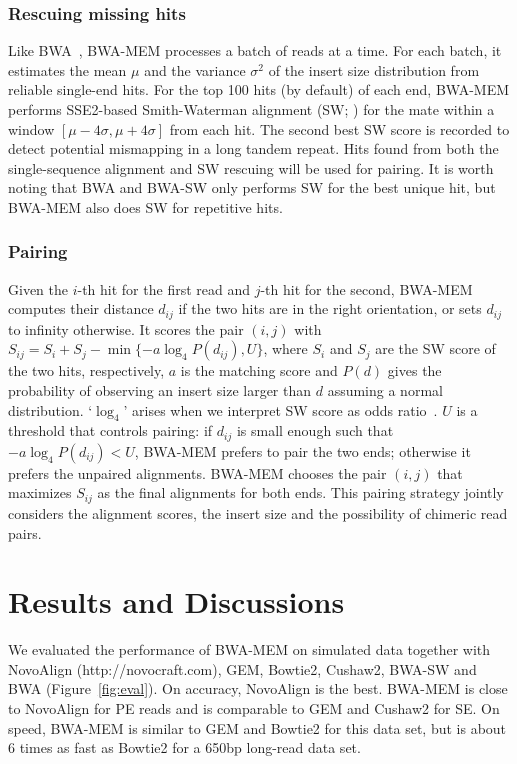 \documentclass{bioinfo}
\begin{document}
\begin{methods}
\subsubsection{Rescuing missing hits}
Like BWA~\citep{Li:2009uq}, BWA-MEM processes a batch of reads at a time.
For each batch, it estimates the mean $\mu$ and the variance $\sigma^2$
of the insert size distribution from reliable single-end hits. For the
top 100 hits (by default) of each end, BWA-MEM performs SSE2-based
Smith-Waterman alignment (SW; \citealt{Farrar:2007hs}) for the mate within a
window $[\mu-4\sigma,\mu+4\sigma]$ from each hit. The second best SW score is
recorded to detect potential mismapping in a long tandem repeat. Hits found
from both the single-sequence alignment and SW rescuing will be used for
pairing. It is worth noting that BWA and BWA-SW only performs SW for the
best unique hit, but BWA-MEM also does SW for repetitive hits.

\subsubsection{Pairing} Given the $i$-th hit for the first read and $j$-th hit
for the second, BWA-MEM computes their distance $d_{ij}$ if the two hits are in
the right orientation, or sets $d_{ij}$ to infinity otherwise. It scores the
pair $(i,j)$ with $S_{ij}=S_i+S_j-\min\{-a\log_4 P(d_{ij}),U\}$, where $S_i$
and $S_j$ are the SW score of the two hits, respectively, $a$ is the matching
score and $P(d)$ gives the probability of observing an insert size larger than
$d$ assuming a normal distribution. `$\log_4$' arises when we interpret SW
score as odds ratio~\citep{Durbin:1998uq}. $U$ is a threshold that controls
pairing: if $d_{ij}$ is small enough such that $-a\log_4 P(d_{ij})<U$, BWA-MEM
prefers to pair the two ends; otherwise it prefers the unpaired alignments.
BWA-MEM chooses the pair $(i,j)$ that maximizes $S_{ij}$ as the final
alignments for both ends.  This pairing strategy jointly considers the
alignment scores, the insert size and the possibility of chimeric read pairs.

\end{methods}

\section{Results and Discussions}

We evaluated the performance of BWA-MEM on simulated data together with
NovoAlign (http://novocraft.com), GEM, Bowtie2, Cushaw2, BWA-SW and BWA
(Figure~\ref{fig:eval}). On accuracy, NovoAlign is the best. BWA-MEM is close
to NovoAlign for PE reads and is comparable to GEM and Cushaw2 for SE.  On
speed, BWA-MEM is similar to GEM and Bowtie2 for this data set, but is about
6 times as fast as Bowtie2 for a 650bp long-read data set.
\end{document}
